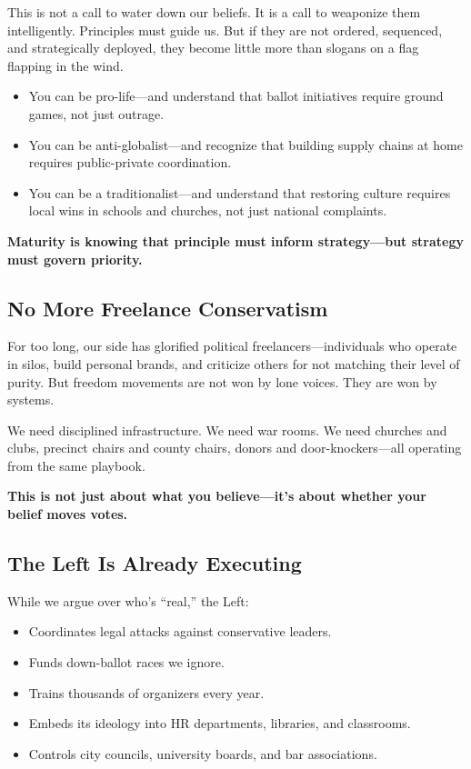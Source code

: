This is not a call to water down our beliefs. It is a call to weaponize them intelligently. Principles must guide us. But if they are not ordered, sequenced, and strategically deployed, they become little more than slogans on a flag flapping in the wind.

\begin{itemize}
    \item You can be pro-life—and understand that ballot initiatives require ground games, not just outrage.
    \item You can be anti-globalist—and recognize that building supply chains at home requires public-private coordination.
    \item You can be a traditionalist—and understand that restoring culture requires local wins in schools and churches, not just national complaints.
\end{itemize}

\textbf{Maturity is knowing that principle must inform strategy—but strategy must govern priority.}

\subsection*{No More Freelance Conservatism}

For too long, our side has glorified political freelancers—individuals who operate in silos, build personal brands, and criticize others for not matching their level of purity. But freedom movements are not won by lone voices. They are won by systems.

We need disciplined infrastructure. We need war rooms. We need churches and clubs, precinct chairs and county chairs, donors and door-knockers—all operating from the same playbook.

\textbf{This is not just about what you believe—it’s about whether your belief moves votes.}

\subsection*{The Left Is Already Executing}

While we argue over who’s “real,” the Left:
\begin{itemize}
    \item Coordinates legal attacks against conservative leaders.
    \item Funds down-ballot races we ignore.
    \item Trains thousands of organizers every year.
    \item Embeds its ideology into HR departments, libraries, and classrooms.
    \item Controls city councils, university boards, and bar associations.
\end{itemize}

